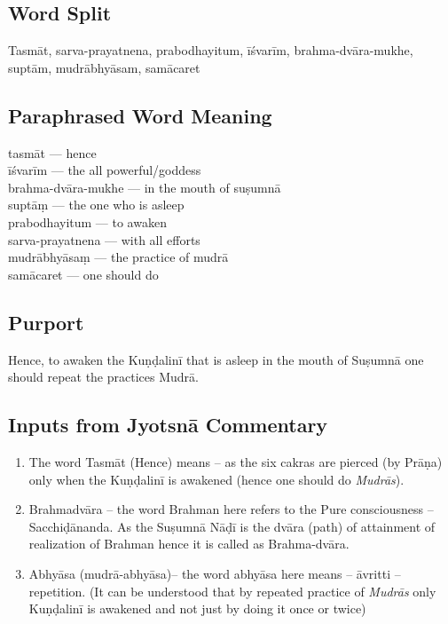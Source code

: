 \subsection*{Word Split}

Tasmāt, sarva-prayatnena, prabodhayitum, īśvarīm, brahma-dvāra-mukhe, suptām, mudrābhyāsam, samācaret

\subsection*{Paraphrased Word Meaning}

\begin{multicols}{2}
tasmāt --- hence \\
īśvarīm --- the all powerful/goddess\\
brahma-dvāra-mukhe --- in the mouth of suṣumnā\\
suptāṃ --- the one who is asleep \\
prabodhayitum --- to awaken\\
sarva-prayatnena --- with all efforts \\
mudrābhyāsaṃ --- the practice of mudrā \\
samācaret ---  one should do
\end{multicols}

\subsection*{Purport}

Hence, to awaken the Kuṇḍalinī that is asleep in the mouth of Suṣumnā one should repeat the practices Mudrā.

\subsection*{Inputs from Jyotsnā Commentary}

\begin{enumerate}
\item The word Tasmāt (Hence) means – as the six cakras are pierced (by Prāṇa) only when the Kuṇḍalinī is awakened (hence one should do \textit{Mudrās}). 
\item Brahmadvāra – the word Brahman here refers to the Pure consciousness – Sacchiḍānanda. As the Suṣumnā Nāḍī is the dvāra (path) of attainment of realization of Brahman hence it is called as Brahma-dvāra. 
\item Abhyāsa (mudrā-abhyāsa)– the word abhyāsa here means – āvritti – repetition. (It can be understood that by repeated practice of \textit{Mudrās} only Kuṇḍalinī is awakened and not just by doing it once or twice)
\end{enumerate}
\newpage

